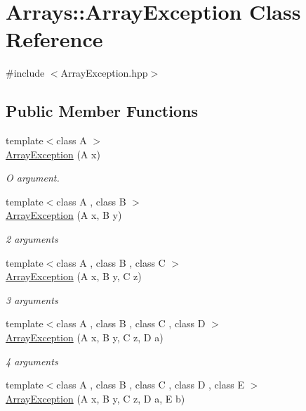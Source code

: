 \hypertarget{classArrays_1_1ArrayException}{}\section{Arrays\+:\+:Array\+Exception Class Reference}
\label{classArrays_1_1ArrayException}


{\ttfamily \#include $<$Array\+Exception.\+hpp$>$}

\subsection*{Public Member Functions}
\begin{DoxyCompactItemize}
\item 
{\footnotesize template$<$class A $>$ }\\\hyperlink{classArrays_1_1ArrayException_aa450c2b3dd43ddbb1c7ecb0b1d036a16}{Array\+Exception} (A x)
\begin{DoxyCompactList}\small\item\em O argument. \end{DoxyCompactList}\item 
{\footnotesize template$<$class A , class B $>$ }\\\hyperlink{classArrays_1_1ArrayException_aa4a223d73cf5e14f9db35aabb57d1533}{Array\+Exception} (A x, B y)
\begin{DoxyCompactList}\small\item\em 2 arguments \end{DoxyCompactList}\item 
{\footnotesize template$<$class A , class B , class C $>$ }\\\hyperlink{classArrays_1_1ArrayException_a7ddd3612e1c8b3443a8f466007cb2c7f}{Array\+Exception} (A x, B y, C z)
\begin{DoxyCompactList}\small\item\em 3 arguments \end{DoxyCompactList}\item 
{\footnotesize template$<$class A , class B , class C , class D $>$ }\\\hyperlink{classArrays_1_1ArrayException_ade8ee10723ef1f2c1f518118033bfd67}{Array\+Exception} (A x, B y, C z, D a)
\begin{DoxyCompactList}\small\item\em 4 arguments \end{DoxyCompactList}\item 
{\footnotesize template$<$class A , class B , class C , class D , class E $>$ }\\\hyperlink{classArrays_1_1ArrayException_a1470913cc8816dfdcbf8858e95e35ffd}{Array\+Exception} (A x, B y, C z, D a, E b)

\end{DoxyCompactItemize}
